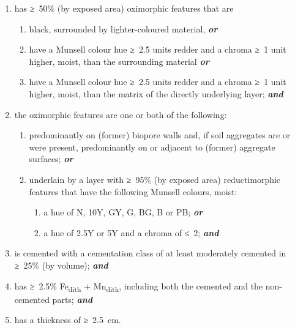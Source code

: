 \documentclass[
  letterpaper,
  DIV=11,
  numbers=noendperiod]{scrreprt}
\providecommand{\tightlist}{%
  \setlength{\itemsep}{0pt}\setlength{\parskip}{0pt}}\usepackage{longtable,booktabs,array}
\begin{document}
\begin{enumerate}
\def\labelenumi{\arabic{enumi}.}
\tightlist
\item
  has ≥~50\% (by exposed area) oximorphic features that are

  \begin{enumerate}
  \def\labelenumii{\alph{enumii}.}
  \tightlist
  \item
    black, surrounded by lighter-coloured material, \textbf{\emph{or}}
  \item
    have a Munsell colour hue ≥~2.5 units redder and a chroma ≥~1 unit
    higher, moist, than the surrounding material \textbf{\emph{or}}
  \item
    have a Munsell colour hue ≥~2.5 units redder and a chroma ≥~1 unit
    higher, moist, than the matrix of the directly underlying layer;
    \textbf{\emph{and}}
  \end{enumerate}
\item
  the oximorphic features are one or both of the following:

  \begin{enumerate}
  \def\labelenumii{\alph{enumii}.}
  \tightlist
  \item
    predominantly on (former) biopore walls and, if soil aggregates are
    or were present, predominantly on or adjacent to (former) aggregate
    surfaces; \textbf{\emph{or}}
  \item
    underlain by a layer with ≥~95\% (by exposed area) reductimorphic
    features that have the following Munsell colours, moist:

    \begin{enumerate}
    \def\labelenumiii{\roman{enumiii}.}
    \item
      a hue of N, 10Y, GY, G, BG, B or PB; \textbf{\emph{or}}
    \item
      a hue of 2.5Y or 5Y and a chroma of ≤~2; \textbf{\emph{and}}
    \end{enumerate}
  \end{enumerate}
\item
  is cemented with a cementation class of at least moderately cemented
  in ≥~25\% (by volume); \textbf{\emph{and}}
\item
  has ≥~2.5\% Fe\textsubscript{dith} + Mn\textsubscript{dith}, including
  both the cemented and the non-cemented parts; \textbf{\emph{and}}
\item
  has a thickness of ≥~2.5~cm.
\end{enumerate}
\end{document}

